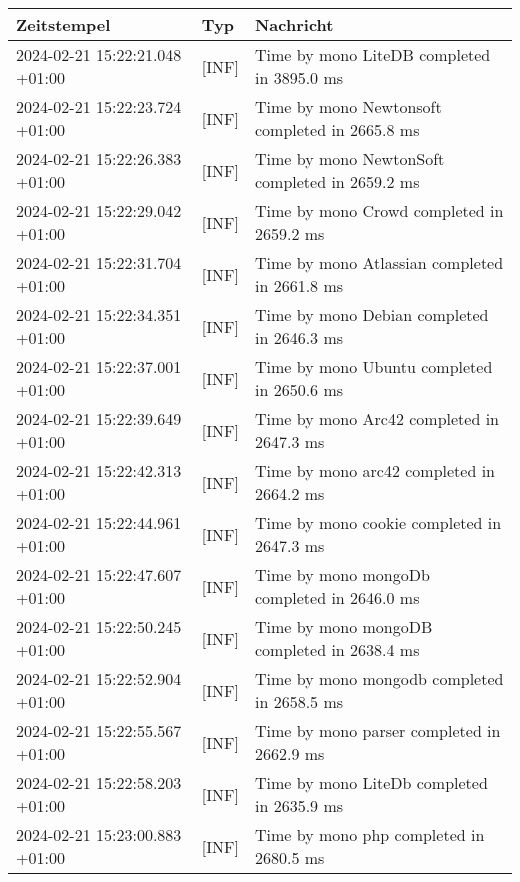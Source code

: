         {
            {\small
                \begin{tabularx}{\textwidth}{|l|l|X|}
                    \hline
                    \textbf{Zeitstempel} & \textbf{Typ} & \textbf{Nachricht} \\
                    \hline
                    \endhead
                    2024-02-21 15:22:21.048 +01:00 & [INF] & Time by mono LiteDB completed in 3895.0 ms \\
                    2024-02-21 15:22:23.724 +01:00 & [INF] & Time by mono Newtonsoft completed in 2665.8 ms \\
                    2024-02-21 15:22:26.383 +01:00 & [INF] & Time by mono NewtonSoft completed in 2659.2 ms \\
                    2024-02-21 15:22:29.042 +01:00 & [INF] & Time by mono Crowd completed in 2659.2 ms \\
                    2024-02-21 15:22:31.704 +01:00 & [INF] & Time by mono Atlassian completed in 2661.8 ms \\
                    2024-02-21 15:22:34.351 +01:00 & [INF] & Time by mono Debian completed in 2646.3 ms \\
                    2024-02-21 15:22:37.001 +01:00 & [INF] & Time by mono Ubuntu completed in 2650.6 ms \\
                    2024-02-21 15:22:39.649 +01:00 & [INF] & Time by mono Arc42 completed in 2647.3 ms \\
                    2024-02-21 15:22:42.313 +01:00 & [INF] & Time by mono arc42 completed in 2664.2 ms \\
                    2024-02-21 15:22:44.961 +01:00 & [INF] & Time by mono cookie completed in 2647.3 ms \\
                    2024-02-21 15:22:47.607 +01:00 & [INF] & Time by mono mongoDb completed in 2646.0 ms \\
                    2024-02-21 15:22:50.245 +01:00 & [INF] & Time by mono mongoDB completed in 2638.4 ms \\
                    2024-02-21 15:22:52.904 +01:00 & [INF] & Time by mono mongodb completed in 2658.5 ms \\
                    2024-02-21 15:22:55.567 +01:00 & [INF] & Time by mono parser completed in 2662.9 ms \\
                    2024-02-21 15:22:58.203 +01:00 & [INF] & Time by mono LiteDb completed in 2635.9 ms \\
                    2024-02-21 15:23:00.883 +01:00 & [INF] & Time by mono php completed in 2680.5 ms \\

\end{tabularx}}}

